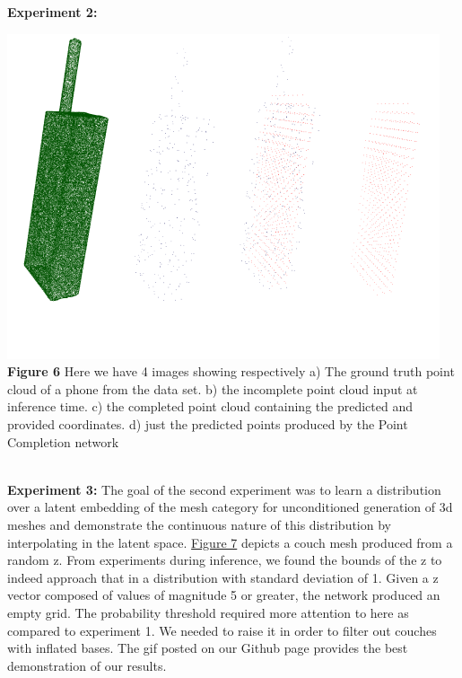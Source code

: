 \documentclass[11pt]{article}
\begin{document}
\textbf{Experiment 2:}

\includegraphics[scale=1.4]{phoneImages/compilation.png} \\
\caption{\hypertarget{fig6}{\textbf{Figure 6}} Here we have 4 images showing respectively a) The ground truth point cloud of a phone from the data set. b) the incomplete point cloud input at inference time. c) the completed point cloud containing the predicted and provided coordinates. d) just the predicted points produced by the Point Completion network}\\

\textbf{Experiment 3:} The goal of the second experiment was to learn a distribution over a latent embedding of the mesh category for unconditioned generation of 3d meshes and demonstrate the continuous nature of this distribution by interpolating in the latent space. \hyperlink{fig7}{Figure 7} depicts a couch mesh produced from a random z. From experiments during inference, we found the bounds of the z to indeed approach that in a distribution with standard deviation of 1. Given a z vector composed of values of magnitude 5 or greater, the network produced an empty grid. The probability threshold required more attention to here as compared to experiment 1. We needed to raise it in order to filter out couches with inflated bases. The gif posted on our Github page provides the best demonstration of our results.
\end{document}
